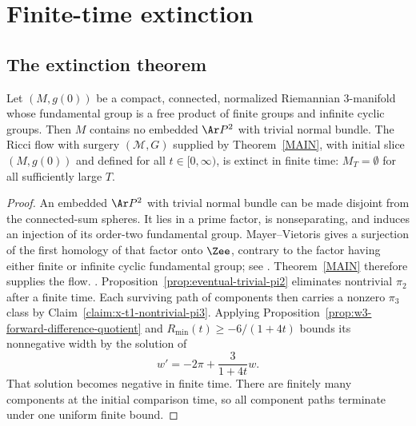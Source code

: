 \chapter{Finite-time extinction}
\label{chap:finite-time-extinction}
\label{energy}

\section{The extinction theorem}

\begin{theorem}
\label{thm:finite-time-extinction-main}
\label{extinct}
Let $(M,g(0))$ be a compact, connected, normalized Riemannian $3$-manifold
whose fundamental group is a free product of finite groups and infinite cyclic
groups. Then $M$ contains no embedded $\Ar P^2$ with trivial normal bundle. The
Ricci flow with surgery $({\mathcal M},G)$ supplied by
Theorem~\ref{MAIN}, with initial slice $(M,g(0))$ and defined for all
$t\in[0,\infty)$, is extinct in finite time: $M_T=\emptyset$ for all
sufficiently large $T$.
\end{theorem}
\begin{proof}
\sketch An embedded $\Ar P^2$ with trivial normal bundle can be made disjoint
from the connected-sum spheres. It lies in a prime factor, is nonseparating,
and induces an injection of its order-two fundamental group. Mayer--Vietoris
gives a surjection of the first homology of that factor onto $\Zee$, contrary
to the factor having either finite or infinite cyclic fundamental group; see
\cite{Hatcher,Hempel}. Theorem~\ref{MAIN} therefore supplies the flow.
\cite{AG,AG,AG,AG,AG,ColdingMinicozzi,HamiltonNSRF3M,Hempel,Hildebrandt,Jost,Perelman3,Perelman3,Perelman3,Perelman3,Perelman3,SacksUhlenbeck,SacksUhlenbeck,SacksUhlenbeck,SacksUhlenbeck,SchoenYau}.
Proposition~\ref{prop:eventual-trivial-pi2} eliminates nontrivial $\pi_2$ after
a finite time. Each surviving path of components then carries a nonzero
$\pi_3$ class by Claim~\ref{claim:x-t1-nontrivial-pi3}. Applying
Proposition~\ref{prop:w3-forward-difference-quotient} and
$R_{\min}(t)\ge-6/(1+4t)$ bounds its nonnegative width by the solution of
\[
w'=-2\pi+\frac{3}{1+4t}w.
\]
That solution becomes negative in finite time. There are finitely many
components at the initial comparison time, so all component paths terminate
under one uniform finite bound.
\end{proof}

